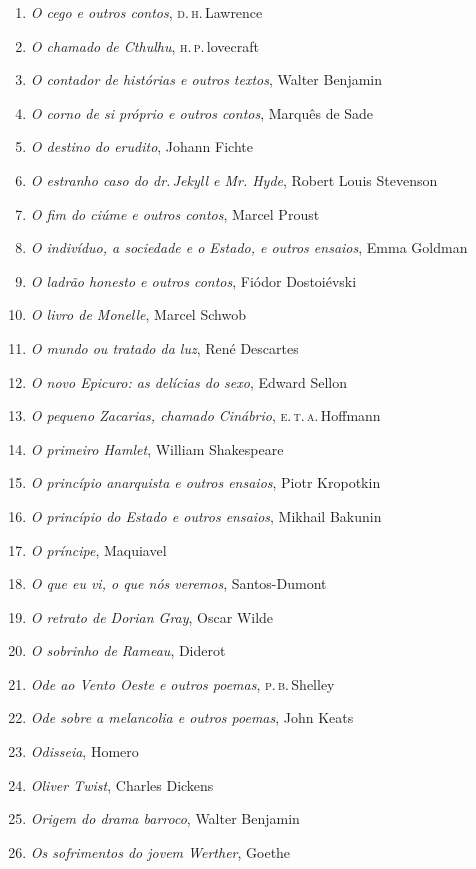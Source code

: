 \begin{enumerate}
\item \textit{O cego e outros contos}, \textsc{d.\,h}.\,Lawrence
\item \textit{O chamado de Cthulhu}, \textsc{h.\,p.}\,lovecraft
\item \textit{O contador de histórias e outros textos}, Walter Benjamin
\item \textit{O corno de si próprio e outros contos}, Marquês de Sade
\item \textit{O destino do erudito}, Johann Fichte
\item \textit{O estranho caso do dr.\,Jekyll e Mr. Hyde}, Robert Louis Stevenson
\item \textit{O fim do ciúme e outros contos}, Marcel Proust
\item \textit{O indivíduo, a sociedade e o Estado, e outros ensaios}, Emma Goldman
\item \textit{O ladrão honesto e outros contos}, Fiódor Dostoiévski
\item \textit{O livro de Monelle}, Marcel Schwob
\item \textit{O mundo ou tratado da luz}, René Descartes
\item \textit{O novo Epicuro: as delícias do sexo}, Edward Sellon
\item \textit{O pequeno Zacarias, chamado Cinábrio}, \textsc{e.\,t.\,a.}\,Hoffmann
\item \textit{O primeiro Hamlet}, William Shakespeare
\item \textit{O princípio anarquista e outros ensaios}, Piotr Kropotkin
\item \textit{O princípio do Estado e outros ensaios}, Mikhail Bakunin
\item \textit{O príncipe}, Maquiavel
\item \textit{O que eu vi, o que nós veremos}, Santos-Dumont
\item \textit{O retrato de Dorian Gray}, Oscar Wilde
\item \textit{O sobrinho de Rameau}, Diderot
\item \textit{Ode ao Vento Oeste e outros poemas}, \textsc{p.\,b.}\,Shelley
\item \textit{Ode sobre a melancolia e outros poemas}, John Keats
\item \textit{Odisseia}, Homero
\item \textit{Oliver Twist}, Charles Dickens
\item \textit{Origem do drama barroco}, Walter Benjamin
\item \textit{Os sofrimentos do jovem Werther}, Goethe

\end{enumerate}

